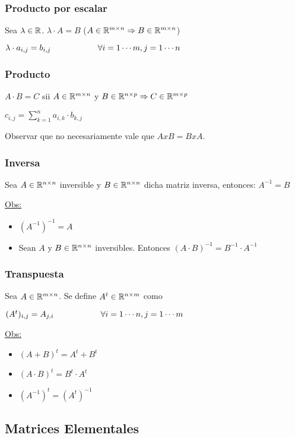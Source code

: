 \subsubsection{Producto por escalar}
Sea $\lambda \in \mathbb{R}$. $\lambda \cdot A = B$ ($A\in\mathbb{R}^{m\times n} \Rightarrow B \in \mathbb{R}^{m\times n}$)
	\begin{center}
		$\lambda \cdot a_{i,j} = b_{i,j}\hspace{2cm} \forall i = 1 \cdots m , j = 1 \cdots n$
	\end{center}

\subsubsection{Producto} $A\cdot B = C$ sii $A\in\mathbb{R}^{m\times n}$ y $B\in\mathbb{R}^{n\times p} \Rightarrow C\in\mathbb{R}^{m\times p}$
	\begin{center}
		$c_{i,j} = \displaystyle \sum_{k=1}^n a_{i,k}\cdot b_{k,j}$
	\end{center}
	Observar que no necesariamente vale que $AxB = BxA$.

\subsubsection{Inversa}
Sea $A\in\mathbb{R}^{n\times n}$ inversible y $B\in\mathbb{R}^{n\times n}$ dicha matriz inversa, entonces:
$A^{-1} = B$

\underline{Obs:}
\begin{itemize}
	\item $(A^{-1})^{-1} = A$
	\item Sean $A$ y $B \in \mathbb{R}^{n\times n}$ inversibles. Entonces $(A\cdot B)^{-1} = B^{-1} \cdot A^{-1}$
\end{itemize}

\subsubsection{Transpuesta}
	Sea $A\in\mathbb{R}^{m\times n}$. Se define $A^t\in\mathbb{R}^{n\times m}$ como
	\begin{center}
		$(A^t)_{i,j} = A_{j,i} \hspace{2cm} \forall i=1\cdots n,j=1\cdots m$
	\end{center}

	\underline{Obs:}
	\begin{itemize}
		\item $(A+B)^t = A^t+B^t$
		\item $(A\cdot B)^t = B^t\cdot A^t$
		\item $(A^{-1})^t = (A^t)^{-1}$
	\end{itemize}


\subsection{Matrices Elementales}

